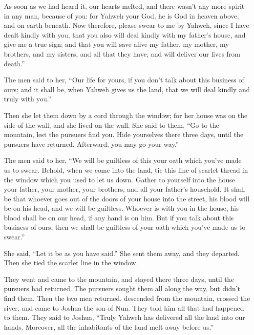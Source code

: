 {As soon as we had heard it, our hearts melted, and there wasn’t any more spirit in any man, because of you: for Yahweh your God, he is God in heaven above, and on earth beneath.
Now therefore, please swear to me by Yahweh, since I have dealt kindly with you, that you also will deal kindly with my father’s house, and give me a true sign;
and that you will save alive my father, my mother, my brothers, and my sisters, and all that they have, and will deliver our lives from death.”
\par }{\PP {}The men said to her, “Our life for yours, if you don’t talk about this business of ours; and it shall be, when Yahweh gives us the land, that we will deal kindly and truly with you.”
\par }{\PP {}Then she let them down by a cord through the window; for her house was on the side of the wall, and she lived on the wall.
She said to them, “Go to the mountain, lest the pursuers find you. Hide yourselves there three days, until the pursuers have returned. Afterward, you may go your way.”
\par }{\PP {}The men said to her, “We will be guiltless of this your oath which you’ve made us to swear.
Behold, when we come into the land, tie this line of scarlet thread in the window which you used to let us down. Gather to yourself into the house your father, your mother, your brothers, and all your father’s household.
It shall be that whoever goes out of the doors of your house into the street, his blood will be on his head, and we will be guiltless. Whoever is with you in the house, his blood shall be on our head, if any hand is on him.
But if you talk about this business of ours, then we shall be guiltless of your oath which you’ve made us to swear.”
\par }{\PP {}She said, “Let it be as you have said.” She sent them away, and they departed. Then she tied the scarlet line in the window.
\par }{\PP {}They went and came to the mountain, and stayed there three days, until the pursuers had returned. The pursuers sought them all along the way, but didn’t find them.
Then the two men returned, descended from the mountain, crossed the river, and came to Joshua the son of Nun. They told him all that had happened to them.
They said to Joshua, “Truly Yahweh has delivered all the land into our hands. Moreover, all the inhabitants of the land melt away before us.”

}
